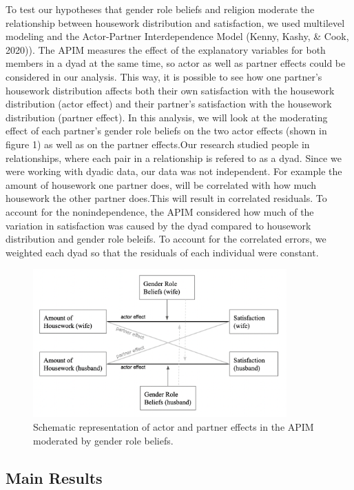 \documentclass[
  man,floatsintext]{apa6}
\begin{document}
To test our hypotheses that gender role beliefs and religion moderate the relationship between housework distribution and satisfaction, we used multilevel modeling and the Actor-Partner Interdependence Model (Kenny, Kashy, \& Cook, 2020)). The APIM measures the effect of the explanatory variables for both members in a dyad at the same time, so actor as well as partner effects could be considered in our analysis. This way, it is possible to see how one partner's housework distribution affects both their own satisfaction with the housework distribution (actor effect) and their partner's satisfaction with the housework distribution (partner effect). In this analysis, we will look at the moderating effect of each partner's gender role beliefs on the two actor effects (shown in figure 1) as well as on the partner effects.Our research studied people in relationships, where each pair in a relationship is refered to as a dyad. Since we were working with dyadic data, our data was not independent. For example the amount of housework one partner does, will be correlated with how much housework the other partner does.This will result in correlated residuals. To account for the nonindependence, the APIM considered how much of the variation in satisfaction was caused by the dyad compared to housework distribution and gender role beleifs. To account for the correlated errors, we weighted each dyad so that the residuals of each individual were constant.



\begin{figure}
\includegraphics[width=3.83in]{APIM} \caption{Schematic representation of actor and partner effects in the APIM moderated by gender role beliefs.}\label{fig:unnamed-chunk-48}
\end{figure}

\hypertarget{main-results}{%
\subsection{Main Results}\label{main-results}}
\end{document}
